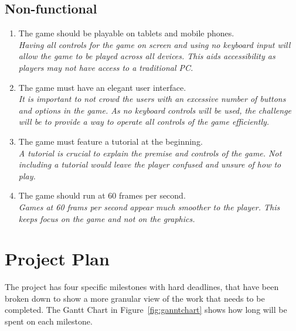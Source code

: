 \documentclass[12pt,a4paper]{report}
\begin{document}
   \section{Non-functional}
   \begin{enumerate}[label*=\thesection.\arabic*]
            \item The game should be playable on tablets and mobile phones.\\
            \textit{Having all controls for the game on screen and using no keyboard input will allow the game to be played across all devices. This aids accessibility as players may not have access to a traditional PC.}
            \item The game must have an elegant user interface.\\
            \textit{It is important to not crowd the users with an excessive number of buttons and options in the game. As no keyboard controls will be used, the challenge will be to provide a way to operate all controls of the game efficiently.}
             \item The game must feature a tutorial at the beginning.\\
            \textit{A tutorial is crucial to explain the premise and controls of the game. Not including a tutorial would leave the player confused and unsure of how to play. }
             \item The game should run at 60 frames per second.\\
            \textit{Games at 60 frams per second appear much smoother to the player. This keeps focus on the game and not on the graphics.}
        \end{enumerate}



\chapter{Project Plan}
\noindent 
The project has four specific milestones with hard deadlines, that have been broken down to show a more granular view of the work that needs to be completed. The Gantt Chart in Figure~\ref{fig:ganntchart} shows how long will be spent on each milestone.
\end{document}
